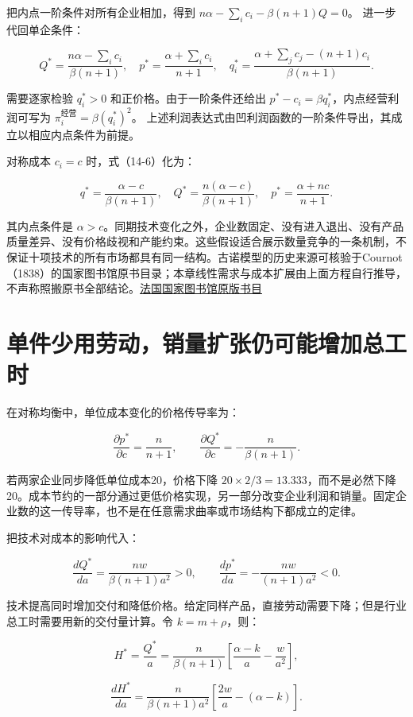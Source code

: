 \documentclass[UTF8,fontset=windows,12pt,a4paper,oneside,openany]{ctexbook}
\begin{document}
把内点一阶条件对所有企业相加，得到
\(n\alpha-\sum_i c_i-\beta(n+1)Q=0\)。
进一步代回单企条件：

\[
Q^*=\frac{n\alpha-\sum_i c_i}{\beta(n+1)},\quad
p^*=\frac{\alpha+\sum_i c_i}{n+1},\quad
q_i^*=\frac{\alpha+\sum_j c_j-(n+1)c_i}{\beta(n+1)}.
\tag{14-6}
\]

需要逐家检验 \(q_i^*>0\) 和正价格。由于一阶条件还给出 \(p^*-c_i=\beta q_i^*\)，内点经营利润可写为
\(\pi_i^{\text{经营}}=\beta(q_i^*)^2\)。
上述利润表达式由凹利润函数的一阶条件导出，其成立以相应内点条件为前提。

对称成本 \(c_i=c\) 时，式（14-6）化为：

\[
q^*=\frac{\alpha-c}{\beta(n+1)},\quad
Q^*=\frac{n(\alpha-c)}{\beta(n+1)},\quad
p^*=\frac{\alpha+nc}{n+1}.
\tag{14-7}
\]

其内点条件是 \(\alpha>c\)。同期技术变化之外，企业数固定、没有进入退出、没有产品质量差异、没有价格歧视和产能约束。这些假设适合展示数量竞争的一条机制，不保证十项技术的所有市场都具有同一结构。古诺模型的历史来源可核验于Cournot（1838）的国家图书馆原书目录；本章线性需求与成本扩展由上面方程自行推导，不声称照搬原书全部结论。\href{https://catalogue.bnf.fr/ark:/12148/cb30280488q}{法国国家图书馆原版书目}

\section{单件少用劳动，销量扩张仍可能增加总工时}

在对称均衡中，单位成本变化的价格传导率为：

\[
\frac{\partial p^*}{\partial c}=\frac{n}{n+1},\qquad
\frac{\partial Q^*}{\partial c}=-\frac{n}{\beta(n+1)}.
\tag{14-8}
\]

若两家企业同步降低单位成本20，价格下降 \(20\times2/3=13.333\)，而不是必然下降20。成本节约的一部分通过更低价格实现，另一部分改变企业利润和销量。固定企业数的这一传导率，也不是在任意需求曲率或市场结构下都成立的定律。

把技术对成本的影响代入：

\[
\frac{dQ^*}{da}=\frac{nw}{\beta(n+1)a^2}>0,\qquad
\frac{dp^*}{da}=-\frac{nw}{(n+1)a^2}<0.
\tag{14-9}
\]

技术提高同时增加交付和降低价格。给定同样产品，直接劳动需要下降；但是行业总工时需要用新的交付量计算。令 \(k=m+\rho\)，则：

\[
H^*=\frac{Q^*}{a}
=\frac{n}{\beta(n+1)}
\left[\frac{\alpha-k}{a}-\frac{w}{a^2}\right],
\]

\[
\frac{dH^*}{da}
=\frac{n}{\beta(n+1)a^2}
\left[\frac{2w}{a}-(\alpha-k)\right].
\tag{14-10}
\]
\end{document}
